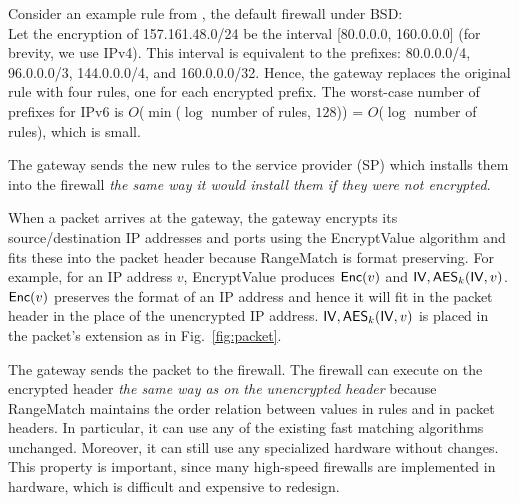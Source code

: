 Consider an example rule from  , the 
default firewall under BSD:
  \\ 
Let the encryption of 157.161.48.0/24 be the interval [80.0.0.0, 160.0.0.0] (for brevity, we use IPv4). 
This interval is equivalent to the prefixes: 80.0.0.0/4, 96.0.0.0/3, 144.0.0.0/4, and 160.0.0.0/32. 
Hence, the gateway replaces the original rule with four rules, one for each encrypted prefix. 
The worst-case number of prefixes for IPv6 is $O$($\min$($\log$ number of rules, $128$)) = $O$($\log$ number of rules), 
which is small. 







The gateway sends the new rules to the service provider (SP) which installs them into the firewall {\em the same way it would install 
them if they were not encrypted}. 

When a packet arrives at the gateway, the gateway encrypts its source/destination IP addresses and ports using the EncryptValue algorithm
and fits these into the packet header because RangeMatch is format preserving.
For example, for an IP address $v$, EncryptValue produces $\mathsf{Enc}(v)$ and $\mathsf{IV}, \mathsf{AES}_k(\mathsf{IV}, v)$.
 $\mathsf{Enc}(v)$ preserves the format of an IP address and hence 
it will fit in the packet header in the place of the unencrypted IP address. $\mathsf{IV}, \mathsf{AES}_k(\mathsf{IV}, v)$ is placed in the packet's extension as in Fig.~\ref{fig:packet}.

The gateway sends the packet to the firewall. The firewall can execute on the encrypted header {\em
the same way as on the unencrypted header} because RangeMatch maintains the order relation between values in rules and in 
packet headers. 
In particular, it can use any of the existing fast matching algorithms unchanged. 
Moreover, it can still use  any specialized hardware without changes. This property is important, since many high-speed firewalls are implemented in hardware, which is difficult and expensive to redesign.


